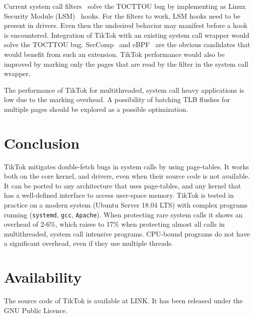 \documentclass[conference]{IEEEtran}
\newcommand{\sysname}{TikTok}
\newcommand{\roughevaloverheadbad}{17\%}
\newcommand{\roughevaloverheadbetter}{2-6\%}
\begin{document}
Current system call filters~\cite{landlock,krsi} solve the TOCTTOU bug by
implementing as Linux Security Module (LSM)~\cite{morris2002linux} hooks. For
the filters to work, LSM hooks need to be present in drivers. Even then the
undesired behavior may manifest before a hook is encountered. Integration of
\sysname{} with an existing system call wrapper would solve the TOCTTOU bug.
SecComp~\cite{seccomp} and eBPF~\cite{ebpf} are the obvious candidates that
would benefit from such an extension. \sysname{} performance would also be
improved by marking only the pages that are read by the filter in the system
call wrapper.

The performance of \sysname{} for multithreaded, system call heavy applications
is low due to the marking overhead. A possibility of batching TLB
flushes for multiple pages should be explored as a possible optimization.

\section{Conclusion}
\sysname{} mitigates double-fetch bugs in system calls by using page-tables. It
works both on the core kernel, and drivers, even when their source code is not
available. It can be ported to any architecture that uses page-tables, and any
kernel that has a well-defined interface to access user-space memory. \sysname{}
is tested in practice on a modern system (Ubuntu Server 18.04 LTS) with complex
programs running (\texttt{systemd}, \texttt{gcc}, \texttt{Apache}). When
protecting rare system calls it shows an overhead of \roughevaloverheadbetter{},
which raises to \roughevaloverheadbad{} when protecting almost all calls in
multithreaded, system call intensive programs. CPU-bound programs do not have a
significant overhead, even if they use multiple threads.

\section*{Availability}

The source code of TikTok is available at LINK. It has been released under the
GNU Public Licence.




\end{document}

